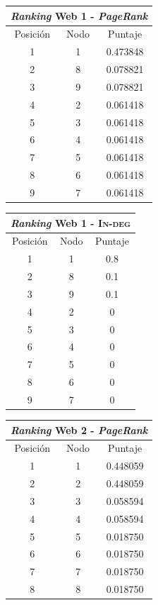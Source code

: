 			   \begin{center}
	      			\begin{tabular}{c|c|c} 
			      		\hline
			  				\multicolumn{3}{c}{\emph{Ranking} Web 1 - \emph{PageRank}} \\
			 			\hline
	        			Posición & Nodo & Puntaje \\ \hline
	         			1 & 1 & 0.473848 \\
	        			2 & 8 & 0.078821 \\
	        			3 & 9 & 0.078821 \\
	        			4 & 2 & 0.061418 \\
	        			5 & 3 & 0.061418 \\
	        			6 & 4 & 0.061418 \\
	        			7 & 5 & 0.061418 \\
	        			8 & 6 & 0.061418 \\
	        			9 & 7 & 0.061418 
	      			\end{tabular} 

	      			\begin{tabular}{c|c|c}
			      		\hline
			  				\multicolumn{3}{c}{\emph{Ranking} Web 1 - \textsc{In-deg}} \\
			 			\hline
	        			Posición & Nodo & Puntaje \\ \hline
	         			1 & 1 & 0.8 \\
	        			2 & 8 & 0.1 \\
	        			3 & 9 & 0.1 \\
	        			4 & 2 & 0 \\
	        			5 & 3 & 0 \\
	        			6 & 4 & 0 \\
	        			7 & 5 & 0 \\
	        			8 & 6 & 0 \\
	        			9 & 7 & 0 
	      			\end{tabular}

	      			\begin{tabular}{c|c|c}
			      		\hline
			  				\multicolumn{3}{c}{\emph{Ranking} Web 2 - \emph{PageRank}} \\
			 			\hline
	        			Posición & Nodo & Puntaje \\ \hline
	         			1 & 1 & 0.448059 \\
	        			2 & 2 & 0.448059 \\
	        			3 & 3 & 0.058594 \\
	        			4 & 4 & 0.058594 \\
	        			5 & 5 & 0.018750 \\
	        			6 & 6 & 0.018750 \\
	        			7 & 7 & 0.018750 \\
	        			8 & 8 & 0.018750
	      			\end{tabular}
	    		

\end{center}
